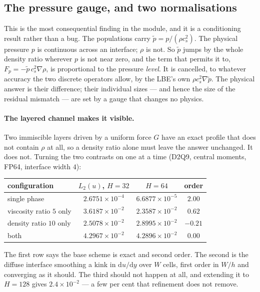 \documentclass[11pt,a4paper]{article}
\newcommand{\cs}{c_s}
\newcommand{\e}[1]{\times 10^{#1}}
\begin{document}
\subsection{The pressure gauge, and two normalisations}\label{sec:gauge}

This is the most consequential finding in the module, and it is a conditioning
result rather than a bug. The populations carry $\tilde p = p/(\rho\cs^2)$. The
physical pressure $p$ is continuous across an interface; $\rho$ is not. So
$\tilde p$ jumps by the whole density ratio wherever $p$ is not near zero, and the
term that permits it to, $F_p=-\tilde p\,\cs^2\nabla\rho$, is proportional to the
pressure \emph{level}. It is cancelled, to whatever accuracy the two discrete
operators allow, by the LBE's own $\rho\cs^2\nabla\tilde p$. The physical answer is
their difference; their individual sizes --- and hence the size of the residual
mismatch --- are set by a gauge that changes no physics.

\paragraph{The layered channel makes it visible.} Two immiscible layers driven by
a uniform force $G$ have an exact profile that does not contain $\rho$ at all, so
a density ratio alone must leave the answer unchanged. It does not. Turning the
two contrasts on one at a time (D2Q9, central moments, FP64, interface width $4$):

\begin{center}\small
\begin{tabular}{lccc}
\toprule
configuration & $L_2(u)$, $H{=}32$ & $H{=}64$ & order \\
\midrule
single phase              & $2.6751\e{-4}$ & $6.6877\e{-5}$ & $2.00$ \\
viscosity ratio $5$ only  & $3.6187\e{-2}$ & $2.3587\e{-2}$ & $0.62$ \\
density ratio $10$ only   & $2.5078\e{-2}$ & $2.8995\e{-2}$ & $-0.21$ \\
both                      & $4.2967\e{-2}$ & $4.2896\e{-2}$ & $0.00$ \\
\bottomrule
\end{tabular}
\end{center}

\noindent The first row says the base scheme is exact and second order. The second
is the diffuse interface smoothing a kink in $\mathrm{d}u/\mathrm{d}y$ over $W$
cells, first order in $W/h$ and converging as it should. The third should not
happen at all, and extending it to $H=128$ gives $2.4\e{-2}$ --- a few per cent
that refinement does not remove.
\end{document}
